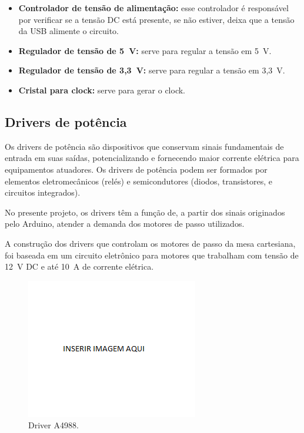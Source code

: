 \begin{itemize}
\item \textbf{Controlador de tensão de alimentação:} esse controlador é responsável por verificar se a tensão DC está presente, se não estiver, deixa que a tensão da \ac{USB} alimente o circuito. 
\item \textbf{Regulador de tensão de 5~V:} serve para regular a tensão em 5~V.
\item \textbf{Regulador de tensão de 3,3~V:} serve para regular a tensão em 3,3~V.
\item \textbf{Cristal para clock:} serve para gerar o clock.
\end{itemize}

\subsection{Drivers de potência}\label{subsec:metdriver}

Os drivers de potência são dispositivos que conservam sinais fundamentais de entrada em suas saídas, 
potencializando e fornecendo maior corrente elétrica para equipamentos atuadores. Os drivers de potência 
podem ser formados por elementos eletromecânicos (relés) e semicondutores (diodos, transistores, e 
circuitos integrados). 

No presente projeto, os drivers têm a função de, a partir dos sinais originados pelo Arduino, atender 
a demanda dos motores de passo utilizados.

A construção dos drivers que controlam os motores de passo da mesa cartesiana, foi baseada em um 
circuito eletrônico para motores que trabalham com tensão de 12~V DC e até 10~A de corrente elétrica. 

\begin{figure}[H]
\centering
\caption{Driver A4988.}\label{fig:driver}
\includegraphics[scale = 0.4]{figuras/driver}
\end{figure}


